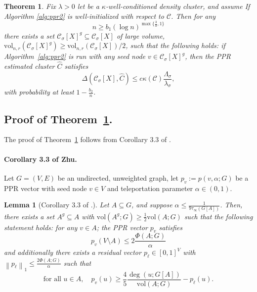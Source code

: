 \documentclass[11pt,twoside]{article}
\newtheorem{theorem}{Theorem}
\newtheorem{lemma}{Lemma}
\theoremstyle{definition}
\newcommand{\vol}{\mathrm{vol}}
\newcommand{\norm}[1]{\left\lVert#1\right\rVert}
\newcommand{\1}{\mathbbm{1}}
\newcommand{\Xbf}{X}
\newcommand{\Cbb}{\mathbb{C}}
\newcommand{\Cset}{\mathcal{C}}
\newcommand{\Csig}{\Cset_{\sigma}}
\newcommand{\Cest}{\widehat{C}}
\begin{document}
\begin{theorem}
	\label{thm:misclassification_rate}
	Fix $\lambda > 0$ let \smash{$\Cset \in \Cbb_f(\lambda)$} be a
	$\kappa$-well-conditioned density cluster, and assume If Algorithm
	\ref{alg:ppr2} is well-initialized with respect to $\Cset$. Then for any
	\begin{equation*}
	n \geq b_1(\log n)^{\max\{\frac{3}{d},1\}}
	\end{equation*}
	there exists a set $\Csig[\Xbf]^g \subseteq \Csig[\Xbf]$ of large volume, $\vol_{n,r}(\Csig[\Xbf]^g) \geq \vol_{n,r}(\Csig[\Xbf])/2$, such that the following holds: if Algorithm~\ref{alg:ppr2} is run with any seed node $v \in \Csig[\Xbf]^g$, then the PPR estimated cluster $\Cest$ satisfies
	\begin{equation}
	\label{eqn: misclassification_rate_ub}
	\Delta(\Csig[\Xbf], \Cest) \leq c \kappa(\Cset)
	\frac{\Lambda_{\sigma}}{\lambda_{\sigma}}, 
	\end{equation}
	with probability at least $1 - \frac{b_2}{n}$.
\end{theorem}

\subsection{Proof of Theorem~\ref{thm:misclassification_rate}.}
The proof of Theorem~\ref{thm:misclassification_rate} follows from Corollary 3.3 of \citet{zhu2013}.

\paragraph{Corollary 3.3 of Zhu.}
Let $G = (V,E)$ be an undirected, unweighted graph, let $p_v := p(v,\alpha;G)$ be a PPR vector with seed node $v \in V$ and teleportation parameter $\alpha \in (0,1)$. 
\begin{lemma}[Corollary 3.3 of \citet{zhu2013}.]
	\label{cor:zhu}
	Let $A \subseteq G$, and suppose $\alpha \leq \frac{1}{9\tau_{\infty}(G[A])}$. Then, there exists a set $A^g \subseteq A$ with $\vol(A^g;G) \geq \frac{1}{2}\vol(A;G)$ such that the following statement holds: for any $v \in A$; the PPR vector $p_v$ satisfies
	\begin{equation}
	\label{eqn:zhu_1}
	p_v(V \setminus A) \leq 2\frac{\Phi(A;G)}{\alpha}
	\end{equation}
	and additionally there exists a residual vector $p_{\ell} \in [0,1]^V$ with $\norm{p_{\ell}}_1 \leq \frac{2\Phi(A;G)}{\alpha}$ such that
	\begin{equation}
	\label{eqn:zhu_2}
	\textrm{for all $u \in A$}, \quad p_v(u) \geq \frac{4}{5} \frac{\deg(u;G[A])}{\vol(A;G)} - p_{\ell}(u).
	\end{equation}
\end{lemma}
\end{document}
